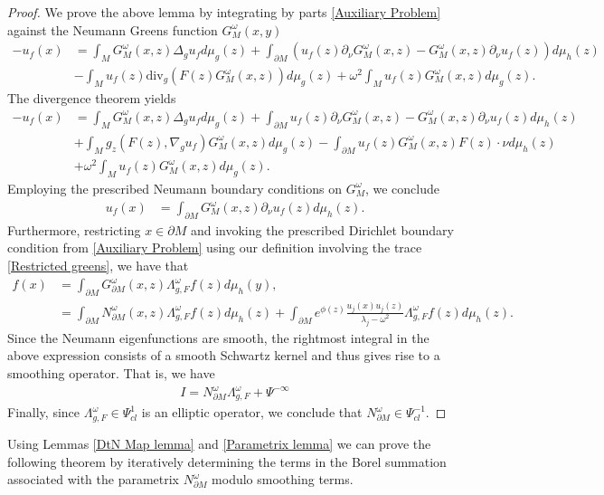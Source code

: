 \documentclass[12pt,a4paper]{amsart}
\numberwithin{equation}{section}
\theoremstyle{plain}
\theoremstyle{definition}
\begin{document}
	\begin{proof}
		We prove the above lemma by integrating by parts \eqref{Auxiliary Problem} against the Neumann Greens function $G^\omega_M(x,y)$
    \begin{align*}
        -u_f(x) &= \int_M G^\omega_M(x,z) \Delta_g u_f d\mu_g(z) + \int_{\partial M} \left(u_f(z)\partial_\nu G^\omega_M(x,z) - G^\omega_M(x,z)\partial_\nu u_f(z)\right) d\mu_h(z)\\
        &- \int_M u_f(z) \text{div}_g(F(z)G^\omega_M(x,z)) d\mu_g(z)+\omega^2\int_M u_f(z) G^\omega_M(x,z) d\mu_g(z).
    \end{align*}
    The divergence theorem yields
    \begin{align*}
        -u_f(x) &= \int_M G^\omega_M(x,z) \Delta_g u_f d\mu_g(z) + \int_{\partial M} u_f(z)\partial_\nu G^\omega_M(x,z) - G^\omega_M(x,z)\partial_\nu u_f(z) d\mu_h(z) \\
			&+\int_M g_z(F(z),\nabla_g u_f) G^\omega_M(x,z) d\mu_g(z) - \int_{\partial M} u_f(z)G^\omega_M(x,z) F(z) \cdot \nu d\mu_h(z)  \\
			&+ \omega^2 \int_M u_f(z) G^\omega_M(x,z)d\mu_g(z).
    \end{align*}
    Employing the prescribed Neumann boundary conditions on $G^\omega_M$, we conclude 
		\begin{align*}
			u_f(x) &= \int_{\partial M} G^\omega_M(x,z) \partial_\nu u_f(z) d\mu_h(z).
		\end{align*}
	Furthermore, restricting $x\in \partial M$ and invoking the prescribed Dirichlet boundary condition from \eqref{Auxiliary Problem} using our definition involving the trace \eqref{Restricted greens}, we have that 
		\begin{align*}
			f(x) &= \int_{\partial M} G^\omega_{\partial M}(x,z) \Lambda^\omega_{g,F}f(z) d\mu_h(y), \\ 
			&= \int_{\partial M} N^\omega_{\partial M}(x,z) \Lambda^\omega_{g,F}f(z) d\mu_h(z) + \int_{\partial M} e^{\phi(z)}\frac{u_j(x)u_j(z)}{\lambda_j-\omega^2} \Lambda_{g,F}^\omega f(z) d\mu_h(z).
		\end{align*}
    Since the Neumann eigenfunctions are smooth, the rightmost integral in the above expression consists of a smooth Schwartz kernel and thus gives rise to a smoothing operator. That is, we have 
		\begin{align*}
			I = N^\omega_{\partial M}\Lambda^\omega_{g,F} + \Psi^{-\infty}
		\end{align*}
    Finally, since $\Lambda_{g,F}^\omega \in \Psi^1_{cl}$ is an elliptic operator, we conclude that $N^\omega_{\partial M}\in \Psi^{-1}_{cl}$. 
\end{proof}
Using Lemmas \ref{DtN Map lemma} and \ref{Parametrix lemma} we can prove the following theorem by iteratively determining the terms in the Borel summation associated with the parametrix $N_{\partial M}^\omega$ modulo smoothing terms. 
\end{document}
